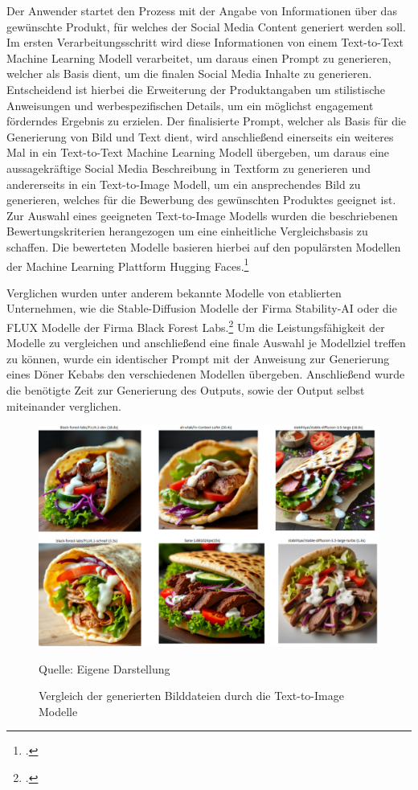 Der Anwender startet den Prozess mit der Angabe von Informationen über das gewünschte Produkt, für welches der Social Media Content generiert werden soll.
Im ersten Verarbeitungsschritt wird diese Informationen von einem Text-to-Text Machine Learning Modell verarbeitet, um daraus einen Prompt zu generieren, welcher als Basis dient, um die finalen Social Media Inhalte zu generieren.
Entscheidend ist hierbei die Erweiterung der Produktangaben um stilistische Anweisungen und werbespezifischen Details, um ein möglichst engagement förderndes Ergebnis zu erzielen.
Der finalisierte Prompt, welcher als Basis für die Generierung von Bild und Text dient, wird anschließend einerseits ein weiteres Mal in ein Text-to-Text Machine Learning Modell übergeben, um daraus eine aussagekräftige Social Media Beschreibung in Textform zu generieren und andererseits in ein Text-to-Image Modell, um ein ansprechendes Bild zu generieren, welches für die Bewerbung des gewünschten Produktes geeignet ist.
Zur Auswahl eines geeigneten Text-to-Image Modells wurden die beschriebenen Bewertungskriterien herangezogen um eine einheitliche Vergleichsbasis zu schaffen.
Die bewerteten Modelle basieren hierbei auf den populärsten Modellen der Machine Learning Plattform Hugging Faces.\footcite{huggingface_models}

Verglichen wurden unter anderem bekannte Modelle von etablierten Unternehmen, wie die Stable-Diffusion Modelle der Firma Stability-AI oder die FLUX Modelle der Firma Black Forest Labs.\footcite{stabilityai,blackforestlabs}
Um die Leistungsfähigkeit der Modelle zu vergleichen und anschließend eine finale Auswahl je Modellziel treffen zu können, wurde ein identischer Prompt mit der Anweisung zur Generierung eines Döner Kebabs den verschiedenen Modellen übergeben.
Anschließend wurde die benötigte Zeit zur Generierung des Outputs, sowie der Output selbst miteinander verglichen.
\clearpage
\begin{figure}[htbp]
    \centering
    \includegraphics[width=\textwidth]{abbildungen/Results_image_generation}
    \caption{Vergleich der generierten Bilddateien durch die Text-to-Image Modelle}
    \label{fig:results_image_generation}
    \raggedright Quelle: Eigene Darstellung
\end{figure}


